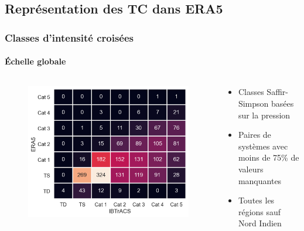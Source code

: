 \documentclass[aspectratio=169, usepdftitle=false, xcolor={dvipsnames}, 9pt,table]{beamer}
\begin{document}
\subsection*{Représentation des TC dans ERA5}
\begin{frame}[t]
    \frametitle{Classes d'intensité croisées}
    \framesubtitle{Échelle globale}
    \begin{columns}
        \begin{column}{0.5\textwidth}
            \vspace{1em}
            \begin{figure}
                \centering
                \includegraphics[width=\textwidth]{Figures/crosstable_global_myVTU.png}
            \end{figure}
        \end{column}
        \begin{column}{0.5\textwidth}
            \footnotesize
            \setlength{\leftmargini}{3.5ex}
            \begin{examples}[Méthodologie]
                \begin{itemize}
                    \item Classes Saffir-Simpson basées sur la \alert{pression}\\\parencite{klotzbach_surface_2020}
                    \item Paires de systèmes avec moins de 75\% de valeurs manquantes
                    \item Toutes les régions sauf Nord Indien
                \end{itemize}    

\end{examples}
\end{column}
\end{columns}
\end{frame}
\end{document}
